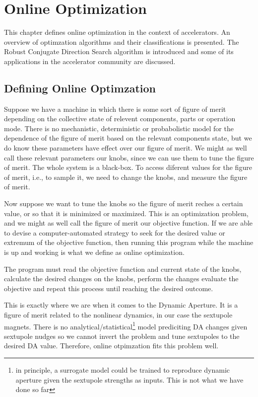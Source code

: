 \chapter{Online Optimization}
This chapter defines online optimization in the context of accelerators. An overview of optimzation algorithms and their classifications is presented. The Robust Conjugate Direction Search algorithm is introduced and some of its applications in the accelerator community are discussed.
\section{Defining Online Optimzation}
Suppose we have a machine in which there is some sort of figure of merit depending on the collective state of relevent components, parts or operation mode. There is no mechanistic, deterministic or probabolistic model for the dependence of the figure of merit based on the relevant components state, but we do know these parameters have effect over our figure of merit. We might as well call these relevant parameters our knobs, since we can use them to tune the figure of merit. The whole system is a black-box. To access diferent values for the figure of merit, i.e., to sample it, we need to change the knobs, and measure the figure of merit.

Now suppose we want to tune the knobs so the figure of merit reches a certain value, or so that it is minimized or maximized. This is an optimization problem, and we might as well call the figure of merit our objective function. If we are able to devise a computer-automated strategy to seek for the desired value or extremum of the objective function, then running this program while the machine is up and working is what we define as online optimization.

The program must read the objective function and current state of the knobs, calculate the desired changes on the knobs, perform the changes evaluate the objective and repeat this process until reaching the desired outcome.

This is exactly where we are when it comes to the Dynamic Aperture. It is a figure of merit related to the nonlinear dynamics, in our case the sextupole magnets. There is no analytical/statistical\footnote{in principle, a surrogate model could be trained to reproduce dynamic aperture given the sextupole strengths as inputs. This is not what we have done so far} model prediciting DA changes given sextupole nudges so we cannot invert the problem and tune sextupoles to the desired DA value. Therefore, online otpimzation fits this problem well.


